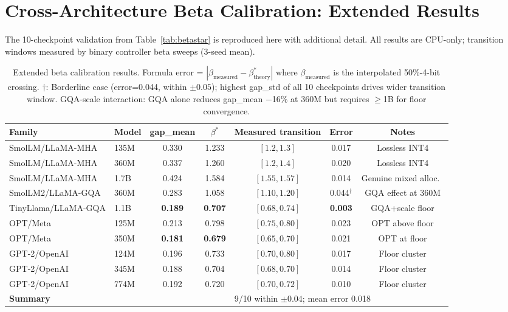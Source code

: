 \documentclass{article}
\begin{document}
\section{Cross-Architecture Beta Calibration: Extended Results}
\label{app:crossarch}

The 10-checkpoint validation from Table~\ref{tab:betastar} is reproduced here with additional detail. All results are CPU-only; transition windows measured by binary controller beta sweeps (3-seed mean).

\begin{table}[h]
\centering
\caption{Extended beta calibration results. Formula error = $|\beta_\text{measured} - \beta^*_\text{theory}|$ where $\beta_\text{measured}$ is the interpolated 50\%-4-bit crossing. $\dagger$: Borderline case (error=0.044, within $\pm0.05$); highest gap\_std of all 10 checkpoints drives wider transition window. GQA-scale interaction: GQA alone reduces gap\_mean $-$16\% at 360M but requires $\geq$1B for floor convergence.}
\begin{tabular}{llccccc}
\toprule
Family & Model & gap\_mean & $\beta^*$ & Measured transition & Error & Notes \\
\midrule
SmolLM/LLaMA-MHA & 135M & 0.330 & 1.233 & $[1.2, 1.3]$ & 0.017 & Lossless INT4 \\
SmolLM/LLaMA-MHA & 360M & 0.337 & 1.260 & $[1.2, 1.4]$ & 0.020 & Lossless INT4 \\
SmolLM/LLaMA-MHA & 1.7B & 0.424 & 1.584 & $[1.55, 1.57]$ & 0.014 & Genuine mixed alloc.\ \\
SmolLM2/LLaMA-GQA & 360M & 0.283 & 1.058 & $[1.10, 1.20]$ & 0.044$^\dagger$ & GQA effect at 360M \\
TinyLlama/LLaMA-GQA & 1.1B & \textbf{0.189} & \textbf{0.707} & $[0.68, 0.74]$ & \textbf{0.003} & GQA+scale floor \\
OPT/Meta & 125M & 0.213 & 0.798 & $[0.75, 0.80]$ & 0.023 & OPT above floor \\
OPT/Meta & 350M & \textbf{0.181} & \textbf{0.679} & $[0.65, 0.70]$ & 0.021 & OPT at floor \\
GPT-2/OpenAI & 124M & 0.196 & 0.733 & $[0.70, 0.80]$ & 0.017 & Floor cluster \\
GPT-2/OpenAI & 345M & 0.188 & 0.704 & $[0.68, 0.70]$ & 0.014 & Floor cluster \\
GPT-2/OpenAI & 774M & 0.192 & 0.720 & $[0.70, 0.72]$ & 0.010 & Floor cluster \\
\midrule
\multicolumn{4}{l}{\textbf{Summary}} & \multicolumn{3}{l}{9/10 within $\pm0.04$; mean error 0.018} \\
\bottomrule
\end{tabular}
\end{table}
\end{document}
